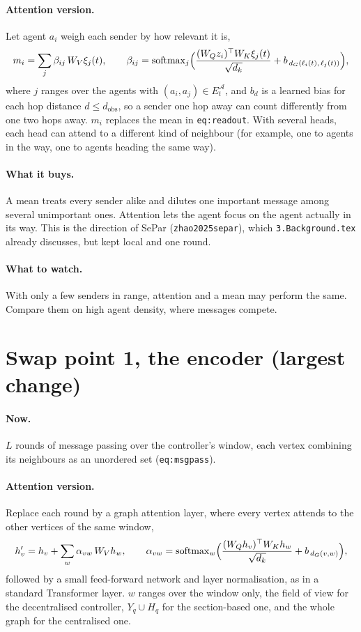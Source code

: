 \documentclass[11pt,a4paper]{article}
\begin{document}
\paragraph{Attention version.} Let agent $a_i$ weigh each sender by how
relevant it is,
\[
  m_i = \sum_{j} \beta_{ij}\, W_V \xi_j(t), \qquad
  \beta_{ij} = \mathrm{softmax}_j\Bigl( \frac{(W_Q z_i)^\top W_K \xi_j(t)}{\sqrt{d_k}} + b_{\,d_G(\ell_i(t),\,\ell_j(t))} \Bigr),
\]
where $j$ ranges over the agents with $(a_i,a_j) \in E^{\mathcal{A}}_t$,
and $b_d$ is a learned bias for each hop distance $d \le d_{\mathrm{obs}}$,
so a sender one hop away can count differently from one two hops away.
$m_i$ replaces the mean in \texttt{eq:readout}. With several heads, each
head can attend to a different kind of neighbour (for example, one to
agents in the way, one to agents heading the same way).

\paragraph{What it buys.} A mean treats every sender alike and dilutes one
important message among several unimportant ones. Attention lets the agent
focus on the agent actually in its way. This is the direction of SePar
(\texttt{zhao2025separ}), which \texttt{3.Background.tex} already
discusses, but kept local and one round.

\paragraph{What to watch.} With only a few senders in range, attention and
a mean may perform the same. Compare them on high agent density, where
messages compete.

\section{Swap point 1, the encoder (largest change)}

\paragraph{Now.} $L$ rounds of message passing over the controller's
window, each vertex combining its neighbours as an unordered set
(\texttt{eq:msgpass}).

\paragraph{Attention version.} Replace each round by a graph attention
layer, where every vertex attends to the other vertices of the same window,
\[
  h_v' = h_v + \sum_{w} \alpha_{vw}\, W_V h_w, \qquad
  \alpha_{vw} = \mathrm{softmax}_w\Bigl( \frac{(W_Q h_v)^\top W_K h_w}{\sqrt{d_k}} + b_{\,d_G(v,w)} \Bigr),
\]
followed by a small feed-forward network and layer normalisation, as in a
standard Transformer layer. $w$ ranges over the window only, the
field of view for the decentralised controller, $Y_q \cup H_q$ for the
section-based one, and the whole graph for the centralised one.
\end{document}
